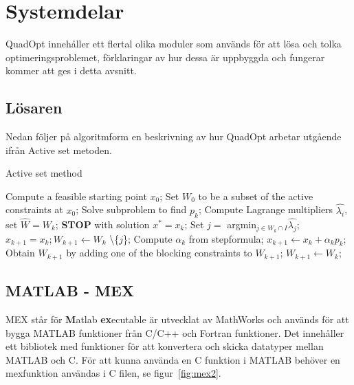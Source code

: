 \section{Systemdelar}
QuadOpt innehåller ett flertal olika moduler som används för att lösa och tolka optimeringsproblemet, förklaringar av hur dessa är uppbyggda och fungerar kommer att ges i detta avsnitt.

\subsection{Lösaren}
Nedan följer på algoritmform en beskrivning av hur QuadOpt arbetar utgående ifrån Active set metoden. 
\begin{algorithm}[H]
\caption{Active set method}
\label{alg:activeset}
\begin{algorithmic}
\State Compute a feasible starting point $x_0$;
\State Set $W_0$ to be a subset of the active constraints at $x_0$;
	\State Solve subproblem to find $p_k$;
		\State Compute Lagrange multipliers $\hat{\lambda_i}$,
		\State set $\hat{W} = W_k$; 
			\State \textbf{STOP} with solution $x^* = x_k$;
		\Else
			\State Set $j =$ argmin$_{j \in W_k \cap I}\hat{\lambda_j}$;
			\State $x_{k+1} = x_k; W_{k+1} \gets W_k$ \textbackslash \{$j$\};		
		\EndIf
	\Else		
		\State Compute $\alpha_k$ from stepformula;
		\State $x_{k+1} \gets x_k + \alpha_k p_k$;
			\State Obtain $W_{k+1}$ by adding one of the blocking constraints to $W_{k+1}$;
		\Else
			\State $W_{k+1} \gets W_k$;	
		\EndIf 	
	\EndIf
\EndFor 
\EndProcedure
\end{algorithmic}
\end{algorithm}

\subsection{MATLAB - MEX} \label{subsec:mex}

MEX står för \textbf{M}atlab \textbf{ex}ecutable är utvecklat av MathWorks och används för att bygga MATLAB funktioner från C/C++ och Fortran funktioner. Det innehåller ett bibliotek med funktioner för att konvertera och skicka datatyper mellan MATLAB och C. För att kunna använda en C funktion i MATLAB behöver en mexfunktion användas i C filen, se figur~\ref{fig:mex2}. 

